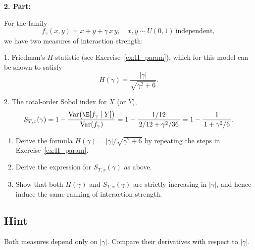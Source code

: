 {\textbf{2. Part:}

For the family
\[
f_\gamma(x,y)=x + y + \gamma\,x\,y,
\quad
x,y\sim U(0,1)\ \text{independent},
\]
we have two measures of interaction strength:

1. Friedman’s $H$‐statistic (see Exercise~\ref{ex:H_param}), which for this model
   can be shown to satisfy
   \[
   H(\gamma) = \frac{|\gamma|}{\sqrt{\gamma^2 + 6}}.
   \]

2. The total‐order Sobol index for $X$ (or $Y$),
   \[
   S_{T,x}(\gamma)
   = 1 - \frac{\text{Var}\bigl(\E[f_\gamma\mid Y]\bigr)}{\text{Var}(f_\gamma)}
   = 1 - \frac{1/12}{\,2/12 + \gamma^2/36\,}
   = 1 - \frac{1}{\,1 + \gamma^2/6\,}.
   \]

\begin{enumerate}%
  \item Derive the formula $H(\gamma)=|\gamma|/\sqrt{\gamma^2+6}$ by
        repeating the steps in Exercise~\ref{ex:H_param}.
  \item Derive the expression for $S_{T,x}(\gamma)$ as above.
  \item Show that both $H(\gamma)$ and $S_{T,x}(\gamma)$ are strictly
        increasing in $|\gamma|$, and hence induce the same ranking of
        interaction strength.
\end{enumerate}

\subsection*{Hint}
Both measures depend only on $|\gamma|$.  Compare their derivatives
with respect to $|\gamma|$.

}